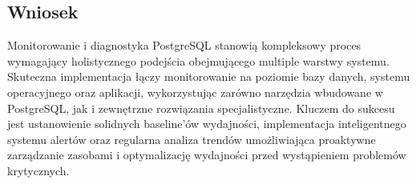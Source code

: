 \documentclass[letterpaper,10pt,polish]{sphinxmanual}
\begin{document}
\subsection{Wniosek}
\label{\detokenize{rozdzial2/repo-wspolne/index:wniosek}}
\sphinxAtStartPar
Monitorowanie i diagnostyka PostgreSQL stanowią kompleksowy proces wymagający holistycznego podejścia obejmującego multiple warstwy systemu. Skuteczna implementacja łączy monitorowanie na poziomie bazy danych, systemu operacyjnego oraz aplikacji, wykorzystując zarówno narzędzia wbudowane w PostgreSQL, jak i zewnętrzne rozwiązania specjalistyczne. Kluczem do sukcesu jest ustanowienie solidnych baseline’ów wydajności, implementacja inteligentnego systemu alertów oraz regularna analiza trendów umożliwiająca proaktywne zarządzanie zasobami i optymalizację wydajności przed wystąpieniem problemów krytycznych.
\end{document}
